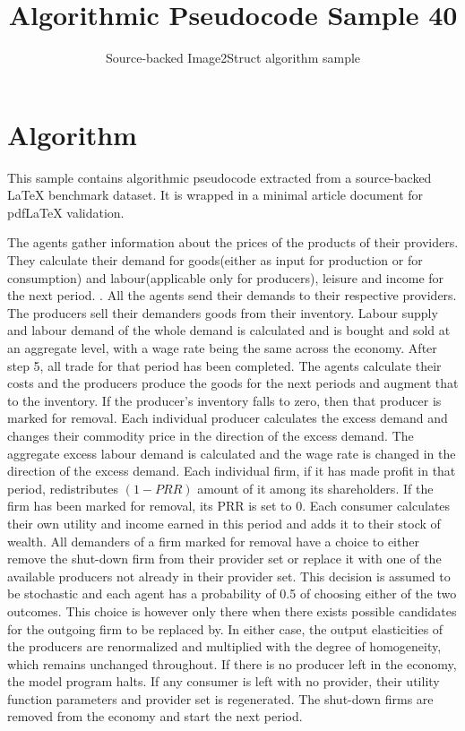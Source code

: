 \documentclass[11pt]{article}
\title{Algorithmic Pseudocode Sample 40}
\author{Source-backed Image2Struct algorithm sample}
\date{}
\begin{document}
\maketitle
\section{Algorithm}
This sample contains algorithmic pseudocode extracted from a source-backed LaTeX benchmark dataset. It is wrapped in a minimal article document for pdfLaTeX validation.

\begin{algorithm}[htbp]
\caption{Source-backed algorithmic procedure}
\begin{algorithmic}[1]
\State The agents gather information about the prices of the products of their providers.
\State They calculate their demand for goods(either as input for production or for consumption) and labour(applicable only for producers), leisure and income for the next period. .
\State All the agents send their demands to their respective providers.
\State The producers sell their demanders goods from their inventory.
\State Labour supply and labour demand of the whole demand is calculated and is bought and sold at an aggregate level, with a wage rate being the same across the economy.
\State After step 5, all trade for that period has been completed. The agents calculate their costs and the producers produce the goods for the next periods and augment that to the inventory. If the producer's inventory falls to zero, then that producer is marked for removal.
\State Each individual producer calculates the excess demand and changes their commodity price in the direction of the excess demand.
\State The aggregate excess labour demand is calculated and the wage rate is changed in the direction of the excess demand.
\State Each individual firm, if it has made profit in that period, redistributes $(1-PRR)$ amount of it among its shareholders. If the firm has been marked for removal, its PRR is set to 0.
\State Each consumer calculates their own utility and income earned in this period and adds it to their stock of wealth.
\State All demanders of a firm marked for removal have a choice to either remove the shut-down firm from their provider set or replace it with one of the available producers not already in their provider set. This decision is assumed to be stochastic and each agent has a probability of 0.5 of choosing either of the two outcomes. This choice is however only there when there exists possible candidates for the outgoing firm to be replaced by. In either case, the output elasticities of the producers are renormalized and multiplied with the degree of homogeneity, which remains unchanged throughout. If there is no producer left in the economy, the model program halts.
\State If any consumer is left with no provider, their utility function parameters and provider set is regenerated.
\State The shut-down firms are removed from the economy and start the next period.
\end{algorithmic}
\end{algorithm}
\end{document}
